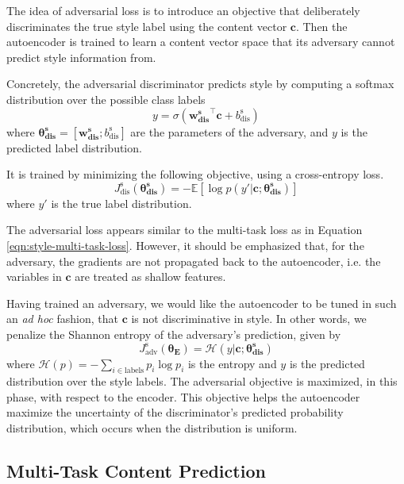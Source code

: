 \documentclass[letterpaper]{article} %
\newcommand{\loss}[2]{J_{\text{#1}}^{\text{#2}}}
\newcommand{\nnweight}[2]{\bm{\theta_{\text{#1}}^{\text{#2}}}}
\newcommand{\weight}[2]{\bm{w_{\text{#1}}^{\text{#2}}}}
\newcommand{\bias}[2]{b_{\text{#1}}^{\text{#2}}}
\begin{document}
The idea of adversarial loss is to introduce an objective that deliberately discriminates the true style label using the content vector $\bm c$.
Then the autoencoder is trained to learn a content vector space that its adversary cannot predict style information from.

Concretely, the adversarial discriminator predicts style by computing a softmax distribution over the possible class labels
\begin{equation}
	y = \sigma({\weight{dis}{s}}^\top \bm c + \bias{dis}{s})
\end{equation}
where $\nnweight{dis}{s}=[\weight{dis}{s}; \bias{dis}{s}]$ are the parameters of the adversary, and $y$ is the predicted label distribution.

It is trained by minimizing the following objective, using a cross-entropy loss.
\begin{equation} \label{eqn:adv-disc-loss}
	\loss{dis}{s} (\nnweight{dis}{s}) =
	- \mathbb{E} [\log p(y' | \bm c; \nnweight{dis}{s})]
\end{equation}
where $y'$ is the true label distribution.

The adversarial loss appears similar to the multi-task loss as in Equation \ref{eqn:style-multi-task-loss}.
However, it should be emphasized that, for the adversary, the gradients are not propagated back to the autoencoder, i.e. the variables in $\bm c$ are treated as shallow features.

Having trained an adversary, we would like the autoencoder to be tuned in such an \textit{ad hoc} fashion, that $\bm c$ is not discriminative in style.
In other words, we penalize the Shannon entropy of the adversary's prediction, given by
\begin{equation}
	\loss{adv}{s}(\nnweight{E}{})=\mathcal{H}(y|\bm c; \nnweight{dis}{s})
\end{equation}
where $\mathcal{H}(p)=-\sum_{i\in\text{labels}}p_i\log p_i$ is the entropy and $y$ is the predicted distribution over the style labels.
The adversarial objective is maximized, in this phase, with respect to the encoder.
This objective helps the autoencoder maximize the uncertainty of the discriminator's predicted probability distribution, which occurs when the distribution is uniform.


\subsection{Multi-Task Content Prediction} \label{ssec:multitask-content-objective}
\end{document}
